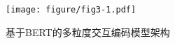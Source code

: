 \begin{figure}[!h]
    \centering
      \texttt{[image: figure/fig3-1.pdf]}
    \caption{基于BERT的多粒度交互编码模型架构}
    \label{fig3-1}
\end{figure}
